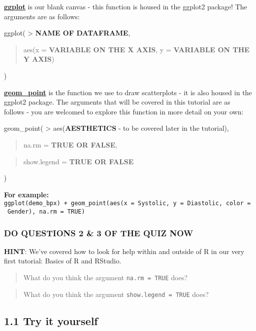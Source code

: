 \documentclass[
]{book}
\begin{document}
\href{https://ggplot2.tidyverse.org/reference/ggplot.html}{\textbf{ggplot}} is our blank canvas - this function is housed in the ggplot2 package! The arguments are as follows:

ggplot(
\textgreater{} \textbf{NAME OF DATAFRAME},

\begin{quote}
aes(x = \textbf{VARIABLE ON THE X AXIS}, y = \textbf{VARIABLE ON THE Y AXIS})
\end{quote}

)

\href{https://ggplot2.tidyverse.org/reference/geom_point.html}{\textbf{geom\_point}} is the function we use to draw scatterplots - it is also housed in the ggplot2 package. The arguments that will be covered in this tutorial are as follows - you are welcomed to explore this function in more detail on your own:

geom\_point(
\textgreater{} aes(\textbf{AESTHETICS} - to be covered later in the tutorial),

\begin{quote}
na.rm = \textbf{TRUE OR FALSE},
\end{quote}

\begin{quote}
show.legend = \textbf{TRUE OR FALSE}
\end{quote}

)

\textbf{For example:} \texttt{ggplot(demo\_bpx)\ +\ geom\_point(aes(x\ =\ Systolic,\ y\ =\ Diastolic,\ color\ =\ Gender),\ na.rm\ =\ TRUE)}

\hypertarget{do-questions-2-3-of-the-quiz-now}{%
\subsubsection{DO QUESTIONS 2 \& 3 OF THE QUIZ NOW}\label{do-questions-2-3-of-the-quiz-now}}

\textbf{HINT}: We've covered how to look for help within and outside of R in our very first tutorial: Basics of R and RStudio.

\begin{quote}
What do you think the argument \texttt{na.rm\ =\ TRUE} does?
\end{quote}

\begin{quote}
What do you think the argument \texttt{show.legend\ =\ TRUE} does?
\end{quote}

\hypertarget{try-it-yourself-23}{%
\subsection{1.1 Try it yourself}\label{try-it-yourself-23}}
\end{document}
